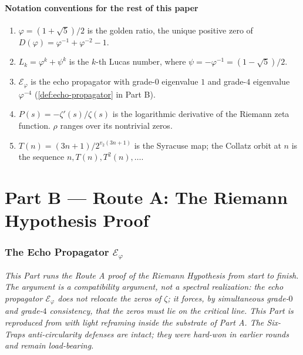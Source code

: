 \documentclass[11pt,a4paper]{article}
\theoremstyle{plain}
\theoremstyle{definition}
\theoremstyle{remark}
\numberwithin{equation}{section}
\providecommand{\vp}{\varphi}
\providecommand{\ps}{\psi}
\providecommand{\EF}{\mathcal{E}}
\providecommand{\Lk}{L}
\newenvironment{sectionopener}
  {\begin{sectionopenerframe}\small\itshape\ignorespaces}
  {\end{sectionopenerframe}}
\begin{document}
\subsection{Notation conventions for the rest of this paper}

\begin{enumerate}[label=\textnormal{(\arabic*)}]
\item $\vp = (1 + \sqrt 5)/2$ is the golden ratio, the unique
  positive zero of $D(\vp) = \vp^{-1} + \vp^{-2} - 1$.
\item $\Lk_k = \vp^k + \ps^k$ is the $k$-th Lucas number, where
  $\ps = -\vp^{-1} = (1 - \sqrt 5)/2$.
\item $\EF_\vp$ is the echo propagator with grade-$0$ eigenvalue
  $1$ and grade-$4$ eigenvalue $\vp^{-4}$ (\cref{def:echo-propagator}
  in Part B).
\item $P(s) = -\zeta'(s)/\zeta(s)$ is the logarithmic derivative
  of the Riemann zeta function.  $\rho$ ranges over its
  nontrivial zeros.
\item $T(n) = (3n+1)/2^{v_2(3n+1)}$ is the Syracuse map; the
  Collatz orbit at $n$ is the sequence
  $n, T(n), T^2(n), \ldots$.
\end{enumerate}

\part*{Part B --- Route A: The Riemann Hypothesis Proof}

\section{The Echo Propagator $\EF_\vp$}
\label{sec:propagator}

\begin{sectionopener}
This Part runs the Route A proof of the Riemann Hypothesis from
start to finish.  The argument is a \emph{compatibility} argument,
not a spectral realization: the echo propagator $\EF_\vp$ does not
relocate the zeros of $\zeta$; it forces, by simultaneous
grade-$0$ and grade-$4$ consistency, that the zeros must lie on
the critical line.  This Part is reproduced from \cite{echo-rh}
with light reframing inside the substrate of Part A.  The
Six-Traps anti-circularity defenses are intact; they were
hard-won in earlier rounds and remain load-bearing.
\end{sectionopener}
\end{document}
